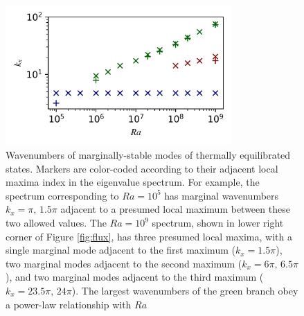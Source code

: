 \documentclass[reprint,amsmath,amssymb,aps]{revtex4-1}
\begin{document}
\begin{figure}
    \centering
    \includegraphics[width=3.4in]{kx_m_ra1.png}
    \caption{Wavenumbers of marginally-stable modes of thermally equilibrated states. 
    Markers are color-coded according to their adjacent local maxima index in the eigenvalue spectrum. 
    For example, the spectrum corresponding to $Ra = 10^5$ has marginal wavenumbers $k_x = \pi, \, 1.5\pi$ adjacent to a presumed local maximum between these two allowed values. 
    The $Ra = 10^9$ spectrum, shown in lower right corner of Figure \ref{fig:flux}, has three presumed local maxima, with a single marginal mode adjacent to the first maximum ($k_x = 1.5\pi$), two marginal modes adjacent to the second maximum ($k_x = 6\pi, \, 6.5\pi$), and two marginal modes adjacent to the third maximum ($k_x = 23.5\pi, \, 24\pi$). 
    The largest wavenumbers of the green branch obey a power-law relationship with $Ra$}
    \label{fig:kx_marginals}
\end{figure}
\end{document}
